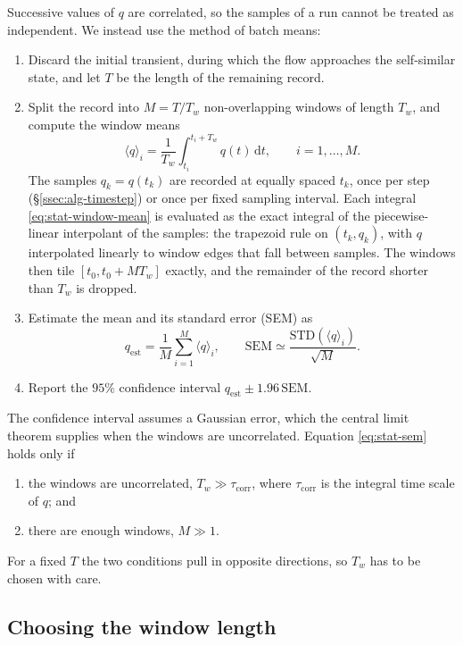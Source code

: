\documentclass{article}
\begin{document}
Successive values of $q$ are correlated, so the samples of a run cannot be
treated as independent. We instead use the method of batch means:
\begin{enumerate}
  \item Discard the initial transient, during which the flow approaches the
  self-similar state, and let $T$ be the length of the remaining record.
  \item Split the record into $M = T/T_w$ non-overlapping windows of length
  $T_w$, and compute the window means
  \begin{equation}\label{eq:stat-window-mean}
    \langle q \rangle_i = \frac{1}{T_w} \int_{t_i}^{t_i + T_w} q(t)\, \mathrm{d}t ,
    \qquad i = 1, \dots, M .
  \end{equation}
  The samples $q_k = q(t_k)$ are recorded at equally spaced $t_k$, once per
  step (\S\ref{ssec:alg-timestep}) or once per fixed sampling interval. Each
  integral \eqref{eq:stat-window-mean} is evaluated as the exact integral of the piecewise-linear interpolant of the samples: the trapezoid
  rule on $(t_k, q_k)$, with $q$ interpolated linearly to window edges that
  fall between samples. The windows then tile $[t_0, t_0 + M T_w]$ exactly,
  and the remainder of the record shorter than $T_w$ is dropped.
  \item Estimate the mean and its standard error (SEM) as
  \begin{equation}\label{eq:stat-sem}
    q_{\mathrm{est}} = \frac{1}{M} \sum_{i=1}^{M} \langle q \rangle_i ,
    \qquad
    \mathrm{SEM} \simeq \frac{\mathrm{STD}(\langle q \rangle_i)}{\sqrt{M}} .
  \end{equation}
  \item Report the $95\%$ confidence interval
  $q_{\mathrm{est}} \pm 1.96\,\mathrm{SEM}$.
\end{enumerate}
The confidence interval assumes a Gaussian error, which the central limit
theorem supplies when the windows are uncorrelated. Equation \eqref{eq:stat-sem}
holds only if
\begin{enumerate}
  \item the windows are uncorrelated, $T_w \gg \tau_{\mathrm{corr}}$, where
  $\tau_{\mathrm{corr}}$ is the integral time scale of $q$; and
  \item there are enough windows, $M \gg 1$.
\end{enumerate}
For a fixed $T$ the two conditions pull in opposite directions, so $T_w$ has to
be chosen with care.

\subsection{Choosing the window length}\label{ssec:stat-window}
\end{document}

